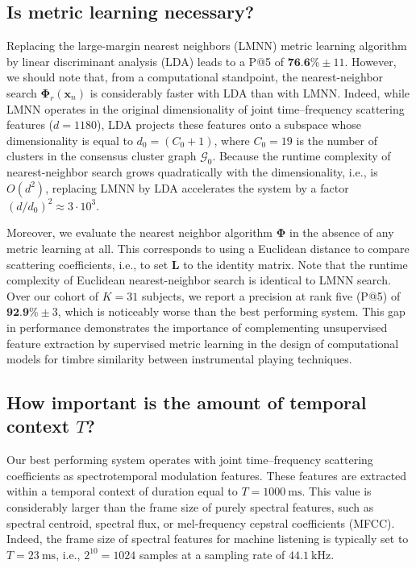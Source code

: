 \documentclass{bmcart}
\begin{document}
\subsection*{Is metric learning necessary?}
Replacing the large-margin nearest neighbors (LMNN) metric learning algorithm by linear discriminant analysis (LDA) leads to a P@5 of $\textbf{76.6}\% \pm 11$.
However, we should note that, from a computational standpoint, the nearest-neighbor search $\mathbf{\Phi}_r (\boldsymbol{x}_n)$ is considerably faster with LDA than with LMNN.
Indeed, while LMNN operates in the original dimensionality of joint time--frequency scattering features ($d=1180$), LDA projects these features onto a subspace whose dimensionality is equal to $d_0 = (C_0+1)$, where $C_0 = 19$ is the number of clusters in the consensus cluster graph $\mathcal{G}_0$.
Because the runtime complexity of nearest-neighbor search grows quadratically with the dimensionality, i.e., is $O(d^2)$, replacing LMNN by LDA accelerates the system by a factor $(d/d_0)^2 \approx 3 \cdot 10^3$.

Moreover, we evaluate the nearest neighbor algorithm $\mathbf{\Phi}$ in the absence of any metric learning at all.
This corresponds to using a Euclidean distance to compare scattering coefficients, i.e., to set $\mathbf{L}$ to the identity matrix.
Note that the runtime complexity of Euclidean nearest-neighbor search is identical to LMNN search.
Over our cohort of $K=31$ subjects, we report a precision at rank five (P@5) of $\textbf{92.9\%} \pm 3$, which is noticeably worse than the best performing system.
This gap in performance demonstrates the importance of complementing unsupervised feature extraction by supervised metric learning in the design  of computational models for timbre similarity between instrumental playing techniques.


\subsection*{How important is the amount of temporal context $T$?}

Our best performing system operates with joint time--frequency scattering coefficients as spectrotemporal modulation features.
These features are extracted within a temporal context of duration equal to $T=\SI{1000}{\milli\second}$.
This value is considerably larger than the frame size of purely spectral features, such as spectral centroid, spectral flux, or mel-frequency cepstral coefficients (MFCC).
Indeed, the frame size of spectral features for machine listening is typically set to $T=\SI{23}{\milli\second}$, i.e., $2^{10}=1024$ samples at a sampling rate of $\SI{44,1}{\kilo\hertz}$.
\end{document}
